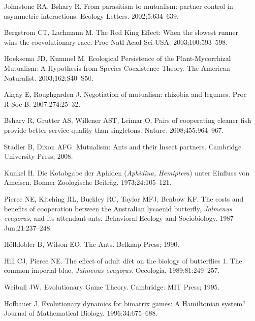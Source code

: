 \documentclass[aps,pre,amsfonts,floatfix, onecolumn,showkeys]{revtex4-1}
\begin{document}
\begin{thebibliography}{10}
Johnstone RA, Bshary R.
\newblock From parasitism to mutualism: partner control in asymmetric
  interactions.
\newblock Ecology Letters. 2002;5:634--639.

Bergstrom CT, Lachmann M.
\newblock The {R}ed {K}ing {E}ffect: When the slowest runner wins the
  coevolutionary race.
\newblock Proc Natl Acad Sci USA. 2003;100:593--598.

Hoeksema JD, Kummel M.
\newblock Ecological Persistence of the Plant-Mycorrhizal Mutualism: A
  Hypothesis from Species Coexistence Theory.
\newblock The American Naturalist. 2003;162:S40--S50.

Ak{\c c}ay E, Roughgarden J.
\newblock Negotiation of mutualism: rhizobia and legumes.
\newblock Proc R Soc B. 2007;274:25--32.

Bshary R, Grutter AS, Willener AST, Leimar O.
\newblock Pairs of cooperating cleaner fish provide better service quality than
  singletons.
\newblock Nature. 2008;455:964--967.

Stadler B, Dixon AFG.
\newblock Mutualism: Ants and their Insect partners.
\newblock Cambridge University Press; 2008.

Kunkel H.
 Die Kotabgabe der Aphiden (\textit{Aphidina, Hemiptera}) unter
  Einfluss von Ameisen.
\newblock Bonner Zoologische Beitr\"{a}g. 1973;24:105--121.

Pierce NE, Kitching RL, Buckley RC, Taylor MFJ, Benbow KF.
\newblock The costs and benefits of cooperation between the Australian lycaenid
  butterfly, \textit{Jalmenus evagoras}, and its attendant ants.
\newblock Behavioral Ecology and Sociobiology. 1987 Jun;21:237--248.

H{\"o}lldobler B, Wilson EO.
\newblock The Ants.
\newblock Belknap Press; 1990.

Hill CJ, Pierce NE.
\newblock The effect of adult diet on the biology of butterflies 1. The common
  imperial blue, \textit{Jalmenus evagoras}.
\newblock Oecologia. 1989;81:249--257.

Weibull JW.
\newblock Evolutionary Game Theory.
\newblock Cambridge: MIT Press; 1995.

Hofbauer J.
\newblock Evolutionary dynamics for bimatrix games: A {H}amiltonian system?
\newblock Journal of Mathematical Biology. 1996;34:675--688.


\end{thebibliography}
\end{document}
